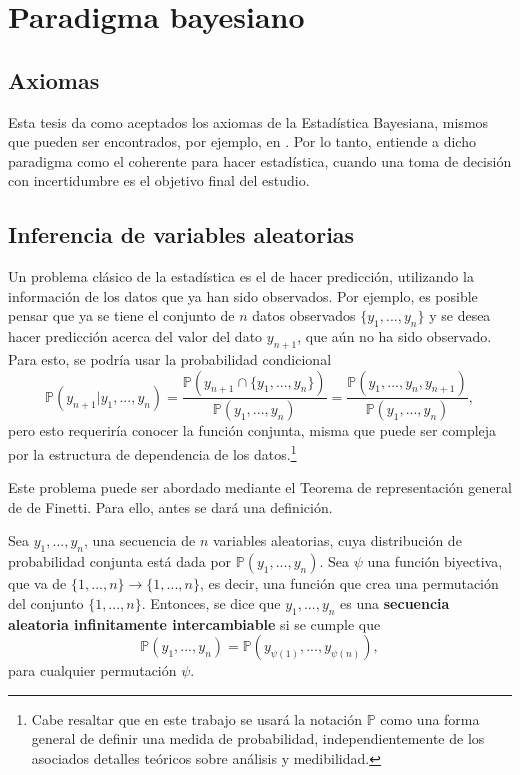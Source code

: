 \chapter[Paradigma bayesiano]{Paradigma bayesiano\raisebox{.3\baselineskip}{\normalsize\footnotemark}}


\section{Axiomas}
Esta tesis da como aceptados los axiomas de la Estad\'istica Bayesiana, mismos que pueden ser encontrados, por ejemplo, en \cite{Fishburn_Axioms}. Por lo tanto, entiende a dicho paradigma como el coherente para hacer estad\'istica, cuando una toma de decisi\'on con incertidumbre es el objetivo final del estudio. 

\section{Inferencia de variables aleatorias}

Un problema clásico de la estad\'istica es el de hacer predicci\'on, utilizando la informaci\'on de los datos que ya han sido observados. Por ejemplo, es posible pensar que ya se tiene el conjunto de $n$ datos observados $\{y_1, ..., y_n\}$ y se desea hacer predicci\'on acerca del valor del dato $y_{n+1}$, que a\'un no ha sido observado. Para esto, se podr\'ia usar la probabilidad condicional
\begin{equation*}
    \mathbb{P}(y_{n+1}|y_1,...,y_n) =
    \frac{\mathbb{P}(y_{n+1} \cap \{y_1, ..., y_n\})}{\mathbb{P}(y_1, ..., y_n)} =
    \frac{\mathbb{P}(y_1, ..., y_n,y_{n+1})}{\mathbb{P}(y_1, ..., y_n)},
\end{equation*}
pero esto requerir\'ia conocer la funci\'on conjunta, misma que puede ser compleja por la estructura de dependencia de los datos.\footnote{Cabe resaltar que en este trabajo se usar\'a la notaci\'on $\mathbb{P}$ como una forma general de definir una medida de probabilidad, independientemente de los asociados detalles te\'oricos sobre an\'alisis y medibilidad.}

Este problema puede ser abordado mediante el Teorema de representaci\'on general de de Finetti. Para ello, antes se dar\'a una definici\'on.

\begin{defin*}
    Sea $y_1,...,y_n$, una secuencia de $n$ variables aleatorias, cuya distribuci\'on de probabilidad conjunta est\'a dada por $\mathbb{P}(y_1,...,y_n)$. Sea $\psi$ una funci\'on biyectiva, que va de $\{1,...,n\} \rightarrow \{1,...,n\}$, es decir, una funci\'on que crea una permutaci\'on del conjunto $\{1,...,n\}$.  
    Entonces, se dice que $y_1,...,y_n$ es una \textbf{secuencia aleatoria infinitamente intercambiable} si se cumple que 
    \begin{equation*}
        \mathbb{P}(y_1,...,y_n) = \mathbb{P}(y_{\psi(1)},...,y_{\psi(n)}),
    \end{equation*}
    para cualquier permutaci\'on $\psi$.
\end{defin*}

